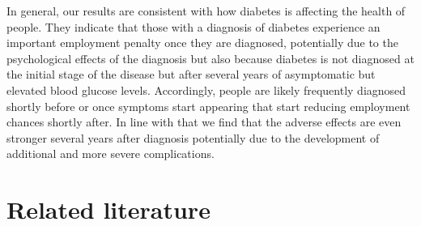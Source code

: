 \documentclass[12pt,english,british]{article}
\begin{document}
In general, our results are consistent with how diabetes is affecting the health of people. They indicate that those with a diagnosis of diabetes experience an important employment penalty once they are diagnosed, potentially due to the psychological effects of the diagnosis but also because diabetes is not diagnosed at the initial stage of the disease but after several years of asymptomatic but elevated blood glucose levels. Accordingly, people are likely frequently diagnosed shortly before or once symptoms  start appearing that start reducing employment chances shortly after. In line with that we find that the adverse effects are even stronger several years after diagnosis potentially due to the development of additional and more severe complications. 


\section{\label{sec:Related literature}Related literature}
\end{document}
